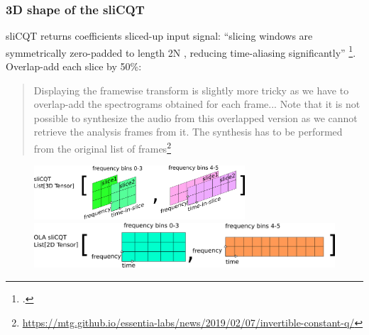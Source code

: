 \documentclass[usenames,dvipsnames]{beamer}
\begin{document}
\begin{frame}
	\frametitle{3D shape of the sliCQT}
	sliCQT returns coefficients sliced-up input signal: ``slicing windows are symmetrically zero-padded to length 2N , reducing time-aliasing significantly'' \footcite[10]{slicq}. Overlap-add each slice by 50\%:
	\begin{quote}
		Displaying the framewise transform is slightly more tricky as we have to overlap-add the spectrograms obtained for each frame... Note that it is not possible to synthesize the audio from this overlapped version as we cannot retrieve the analysis frames from it. The synthesis has to be performed from the original list of frames\footnote{\url{https://mtg.github.io/essentia-labs/news/2019/02/07/invertible-constant-q/}}
	\end{quote}
	\begin{figure}
		\centering
		\includegraphics[height=2cm]{./images-blockdiagrams/slicq3ddatastructure.png}\\
		\includegraphics[height=1.7cm]{./images-blockdiagrams/slicq2ddatastructure.png}
	\end{figure}
\end{frame}
\end{document}
